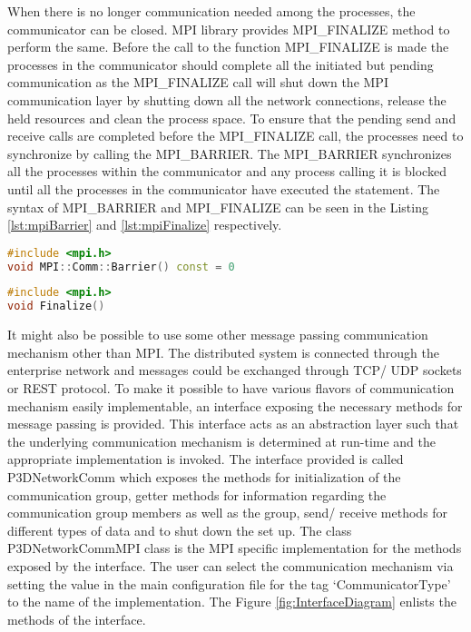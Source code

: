 When there is no longer communication needed among the processes, the communicator can be closed. MPI library provides MPI\_FINALIZE method to perform the same. Before the call to the function MPI\_FINALIZE is made the processes in the communicator should complete all the initiated but pending communication as the MPI\_FINALIZE call will shut down the MPI communication layer by shutting down all the network connections, release the held resources and clean the process space. To ensure that the pending send and receive calls are completed before the MPI\_FINALIZE call, the processes need to synchronize by calling the MPI\_BARRIER. The MPI\_BARRIER synchronizes all the processes within the communicator and any process calling it is blocked until all the processes in the communicator have executed the statement. The syntax of MPI\_BARRIER and MPI\_FINALIZE can be seen in the Listing \ref{lst:mpiBarrier} and \ref{lst:mpiFinalize} respectively.

\begin{lstlisting}[language=C++,label={lst:mpiBarrier},caption={Explicit Synchronization via Barrier}]
#include <mpi.h>
void MPI::Comm::Barrier() const = 0
\end{lstlisting} 

\begin{lstlisting}[language=C++,label={lst:mpiFinalize},caption={Shutting down the MPI environment}]
#include <mpi.h>
void Finalize()
\end{lstlisting} 

It might also be possible to use some other message passing communication mechanism other than MPI. The distributed system is connected through the enterprise network and messages could be exchanged through TCP/ UDP sockets or REST protocol. To make it possible to have various flavors of communication mechanism easily implementable, an interface exposing the necessary methods for message passing is provided. This interface acts as an abstraction layer such that the underlying communication mechanism is determined at run-time and the appropriate implementation is invoked. \newline
The interface provided is called P3DNetworkComm which exposes the methods for initialization of the communication group, getter methods for information regarding the communication group members as well as the group, send/ receive methods for different types of data and to shut down the set up. The class P3DNetworkCommMPI class is the MPI specific implementation for the methods exposed by the interface. The user can select the communication mechanism via setting the value in the main configuration file for the tag {\lq}CommunicatorType{\rq} to the name of the implementation. The Figure \ref{fig:InterfaceDiagram} enlists the methods of the interface.

